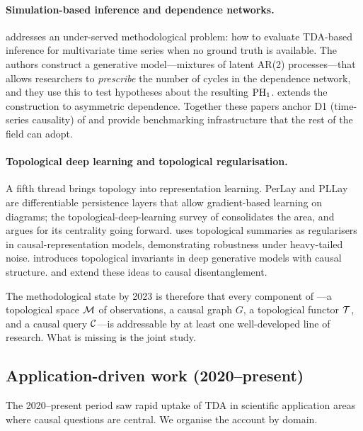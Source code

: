 \paragraph{Simulation-based inference and dependence networks.}
\citet{elyaagoubi2023statistical} addresses an under-served methodological
problem: how to evaluate TDA-based inference for multivariate time
series when no ground truth is available. The authors construct a
generative model---mixtures of latent AR(2) processes---that allows
researchers to \emph{prescribe} the number of cycles in the dependence
network, and they use this to test hypotheses about the resulting
$\mathrm{PH}_{1}$. \citet{elyaagoubi2023topological} extends the construction to
asymmetric dependence. Together these papers anchor D1 (time-series
causality) of  and provide benchmarking
infrastructure that the rest of the field can adopt.

\paragraph{Topological deep learning and topological regularisation.}
A fifth thread brings topology into representation learning. PerLay
\citep{carriere2020perslay} and PLLay \citep{kim2020pllay} are
differentiable persistence layers that allow gradient-based learning
on diagrams; the topological-deep-learning survey of
\citet{hajij2023topological} consolidates the area, and
\citet{papamarkou2024position} argues for its centrality going forward.
\citet{farzam2025topology} uses topological summaries as
regularisers in causal-representation models, demonstrating robustness
under heavy-tailed noise. \citet{xu2021topological} introduces
topological invariants in deep generative models with causal
structure. \citet{guan2025causal} and \citet{ma2025causal} extend
these ideas to causal disentanglement.

The methodological state by 2023 is therefore that every component of
---a topological space $\mathcal{M}$ of observations, a causal
graph $G$, a topological functor $\mathcal{T}$, and a causal query $\mathcal{C}$---is
addressable by at least one well-developed line of research. What is
missing is the joint study.

\subsection{Application-driven work (2020--present)}\label{sec:lit_app}

The 2020--present period saw rapid uptake of TDA in scientific
application areas where causal questions are central. We organise the
account by domain.

